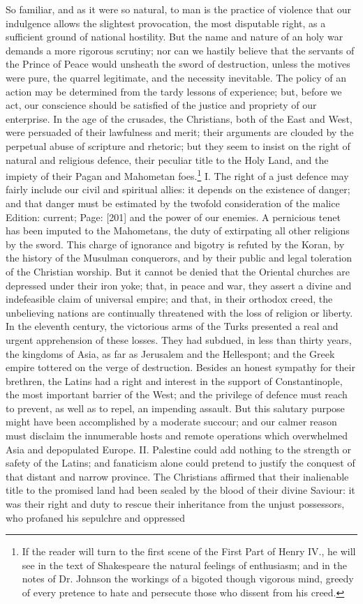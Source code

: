 So familiar, and as it were so natural, to man is the practice of violence that our indulgence allows the slightest provocation, the most disputable right, as a sufficient ground of national hostility. But the name and nature of an holy war demands a more rigorous scrutiny; nor can we hastily believe that the servants of the Prince of Peace would unsheath the sword of destruction, unless the motives were pure, the quarrel legitimate, and the necessity inevitable. The policy of an action may be determined from the tardy lessons of experience; but, before we act, our conscience should be satisfied of the justice and propriety of our enterprise. In the age of the crusades, the Christians, both of the East and West, were persuaded of their lawfulness and merit; their arguments are clouded by the perpetual abuse of scripture and rhetoric; but they seem to insist on the right of natural and religious defence, their peculiar title to the Holy Land, and the impiety of their Pagan and Mahometan foes.\footnote{If the reader will turn to the first scene of the First Part of Henry IV., he will see in the text of Shakespeare the natural feelings of enthusiasm; and in the notes of Dr. Johnson the workings of a bigoted though vigorous mind, greedy of every pretence to hate and persecute those who dissent from his creed.} I. The right of a just defence may fairly include our civil and spiritual allies: it depends on the existence of danger; and that danger must be estimated by the twofold consideration of the malice Edition: current; Page: [201] and the power of our enemies. A pernicious tenet has been imputed to the Mahometans, the duty of extirpating all other religions by the sword. This charge of ignorance and bigotry is refuted by the Koran, by the history of the Musulman conquerors, and by their public and legal toleration of the Christian worship. But it cannot be denied that the Oriental churches are depressed under their iron yoke; that, in peace and war, they assert a divine and indefeasible claim of universal empire; and that, in their orthodox creed, the unbelieving nations are continually threatened with the loss of religion or liberty. In the eleventh century, the victorious arms of the Turks presented a real and urgent apprehension of these losses. They had subdued, in less than thirty years, the kingdoms of Asia, as far as Jerusalem and the Hellespont; and the Greek empire tottered on the verge of destruction. Besides an honest sympathy for their brethren, the Latins had a right and interest in the support of Constantinople, the most important barrier of the West; and the privilege of defence must reach to prevent, as well as to repel, an impending assault. But this salutary purpose might have been accomplished by a moderate succour; and our calmer reason must disclaim the innumerable hosts and remote operations which overwhelmed Asia and depopulated Europe. II. Palestine could add nothing to the strength or safety of the Latins; and fanaticism alone could pretend to justify the conquest of that distant and narrow province. The Christians affirmed that their inalienable title to the promised land had been sealed by the blood of their divine Saviour: it was their right and duty to rescue their inheritance from the unjust possessors, who profaned his sepulchre and oppressed 